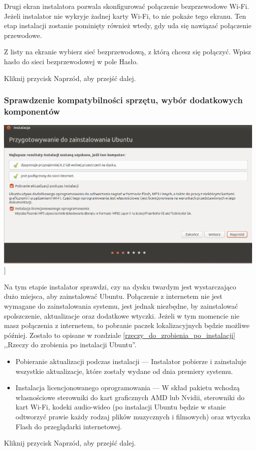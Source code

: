 Drugi ekran instalatora pozwala skonfigurować połączenie bezprzewodowe Wi-Fi. Jeżeli instalator nie wykryje żadnej karty Wi-Fi, to nie pokaże tego ekranu. Ten etap instalacji zostanie pominięty również wtedy, gdy uda się nawiązać połączenie przewodowe.

Z listy na ekranie wybierz sieć bezprzewodową, z którą chcesz się połączyć. Wpisz hasło do sieci bezprzewodowej w pole \textcolor{ubuntu_orange}{Hasło}.
\begin{flushright}
Kliknij przycisk \textcolor{ubuntu_orange}{Naprzód}, aby przejść dalej.
\end{flushright}
\clearpage
\subsubsection{Sprawdzenie kompatybilności sprzętu, wybór dodatkowych komponentów}
\begin{center}
        \includegraphics[width=\linewidth]{images/instalator_wymagania.png}]
\end{center}

Na tym etapie instalator sprawdzi, czy na dysku twardym jest wystarczająco dużo miejsca, aby zainstalować Ubuntu. Połączenie z internetem nie jest wymagane do zainstalowania systemu, jest jednak niezbędne, by zainstalować spolszczenie, aktualizacje oraz dodatkowe wtyczki. Jeżeli w tym momencie nie masz połączenia z internetem, to pobranie paczek lokalizacyjnych będzie możliwe później. Zostało to opisane w rozdziale \ref{rzeczy_do_zrobienia_po_instalacji} ,,Rzeczy do zrobienia po instalacji Ubuntu''.
\begin{itemize}
\item \textcolor{ubuntu_orange}{Pobieranie aktualizacji podczas instalacji} --- Instalator pobierze i zainstaluje wszystkie aktualizacje, które zostały wydane od dnia premiery systemu.
\item \textcolor{ubuntu_orange}{Instalacja licencjonowanego oprogramowania} --- W skład pakietu wchodzą własnościowe sterowniki do kart graficznych AMD lub Nvidii, sterowniki do kart Wi-Fi, kodeki audio-wideo (po instalacji Ubuntu będzie w stanie odtworzyć prawie każdy rodzaj plików muzycznych i filmowych) oraz wtyczka Flash do przeglądarki internetowej.
\end{itemize}
\begin{flushright}
Kliknij przycisk \textcolor{ubuntu_orange}{Naprzód}, aby przejść dalej.
\end{flushright}
\clearpage
